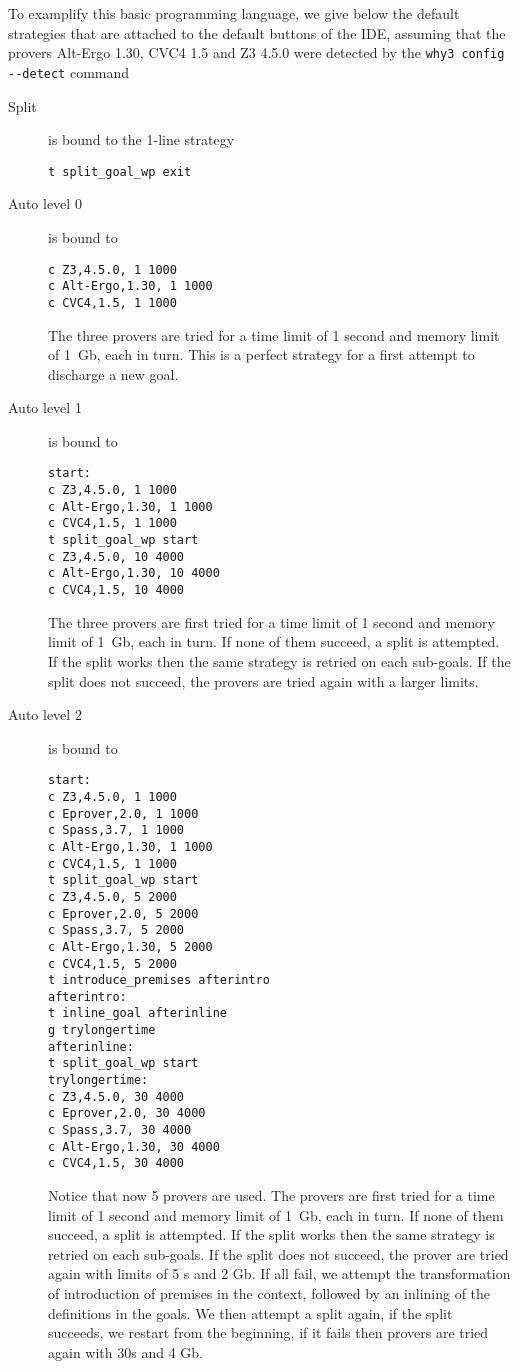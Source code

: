 To examplify this basic programming language, we give below the
default strategies that are attached to the default buttons of the
IDE, assuming that the provers Alt-Ergo 1.30, CVC4 1.5 and Z3 4.5.0
were detected by the \verb|why3 config --detect| command
\begin{description}
\item[Split] is bound to the 1-line strategy
\begin{verbatim}
t split_goal_wp exit
\end{verbatim}

\item[Auto level 0] is bound to
\begin{verbatim}
c Z3,4.5.0, 1 1000
c Alt-Ergo,1.30, 1 1000
c CVC4,1.5, 1 1000
\end{verbatim}
  The three provers are tried for a time limit of 1 second and memory
  limit of 1~Gb, each in turn. This is a perfect strategy for a first
  attempt to discharge a new goal.

\item[Auto level 1] is bound to
\begin{verbatim}
start:
c Z3,4.5.0, 1 1000
c Alt-Ergo,1.30, 1 1000
c CVC4,1.5, 1 1000
t split_goal_wp start
c Z3,4.5.0, 10 4000
c Alt-Ergo,1.30, 10 4000
c CVC4,1.5, 10 4000
\end{verbatim}
  The three provers are first tried for a time limit of 1 second and
  memory limit of 1~Gb, each in turn. If none of them succeed, a
  split is attempted. If the split works then the same strategy is
  retried on each sub-goals. If the split does not succeed, the provers
  are tried again with a larger limits.

\item[Auto level 2] is bound to
\begin{verbatim}
start:
c Z3,4.5.0, 1 1000
c Eprover,2.0, 1 1000
c Spass,3.7, 1 1000
c Alt-Ergo,1.30, 1 1000
c CVC4,1.5, 1 1000
t split_goal_wp start
c Z3,4.5.0, 5 2000
c Eprover,2.0, 5 2000
c Spass,3.7, 5 2000
c Alt-Ergo,1.30, 5 2000
c CVC4,1.5, 5 2000
t introduce_premises afterintro
afterintro:
t inline_goal afterinline
g trylongertime
afterinline:
t split_goal_wp start
trylongertime:
c Z3,4.5.0, 30 4000
c Eprover,2.0, 30 4000
c Spass,3.7, 30 4000
c Alt-Ergo,1.30, 30 4000
c CVC4,1.5, 30 4000
\end{verbatim}
  Notice that now 5 provers are used.  The provers are first tried for
  a time limit of 1 second and memory limit of 1~Gb, each in turn. If
  none of them succeed, a split is attempted. If the split works then
  the same strategy is retried on each sub-goals. If the split does
  not succeed, the prover are tried again with limits of 5 s and 2
  Gb. If all fail, we attempt the transformation of introduction of
  premises in the context, followed by an inlining of the definitions
  in the goals. We then attempt a split again, if the split succeeds,
  we restart from the beginning, if it fails then provers are tried
  again with 30s and 4 Gb.

\end{description}

